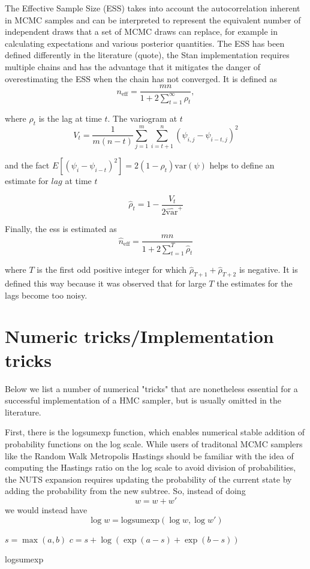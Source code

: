 \documentclass[]{report}
\begin{document}
The Effective Sample Size (ESS) takes into account the autocorrelation inherent in MCMC samples and can be interpreted to represent the equivalent number of independent draws that a set of MCMC draws can replace, for example in calculating expectations and various posterior quantities. The ESS has been defined  differently in the literature (quote), the Stan implementation requires multiple chains and has the advantage that it mitigates the danger of overestimating the ESS when the chain has not converged. It is defined as 
\[n_{\text{eff}}  = \frac{mn}{1 + 2 \sum_{t=1}^\infty \rho_t}, \]

where  $\rho_t$ is the lag at time $t$. The variogram at $t$ 
\[V_t = \frac{1}{m(n-t)} \sum_{j=1}^m \sum_{i=t+1}^n (\psi_{i,j} - \psi_{i-t,j})^2 \]

and the fact $E[(\psi_i - \psi_{i-t})^2] = 2(1-\rho_t)\text{var}(\psi)$ helps to define an estimate for $lag$ at time $t$ 

\[\hat{\rho}_t = 1 - \frac{V_t}{2 \hat{\text{var}}^+}\]

Finally, the ess is estimated as 
\[\hat{n}_{\text{eff}} = \frac{mn}{1 + 2 \sum_{t=1}^T \hat{\rho}_t} \]

where $T$ is the first odd positive integer for which $\hat{\rho}_{T+1} + \hat{\rho}_{T+2} $ is negative. It is defined this way because it was observed that for large $T$ the estimates for the lags become too noisy. 
 
\section{Numeric tricks/Implementation tricks}

Below we list a number of numerical "tricks" that are nonetheless essential for a successful implementation of a HMC sampler, but is usually omitted in the literature. 

First, there is the logsumexp function, which enables numerical stable addition of probability functions on the log scale. While users of traditonal MCMC samplers like the Random Walk Metropolis Hastings should be familiar with the idea of computing the Hastings ratio on the log scale to avoid division of probabilities, the NUTS expansion requires updating the probability of the current state by adding the probability from the new subtree. So, instead of doing 
\[ w = w + w' \] 
we would instead have
\[ \log w = \text{logsumexp}(\log w, \log w' ) \]

\begin{algorithm}
\DontPrintSemicolon
{}
$s = \max(a,b) $\;
$c = s + \log( \exp(a-s) + \exp(b-s)) $\;

\caption{logsumexp}
\end{algorithm}
\end{document}
